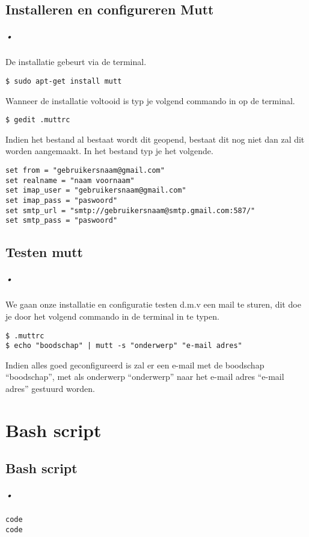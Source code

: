 \documentclass[12pt,a4paper]{report}
\begin{document}
\section{Installeren en configureren Mutt}
\paragraph{•}
De installatie gebeurt via de terminal.
\begin{lstlisting}[frame=BTrl]
$ sudo apt-get install mutt
\end{lstlisting}
Wanneer de installatie voltooid is typ je volgend commando in op de terminal.
\begin{lstlisting}[frame=BTrl]
$ gedit .muttrc
\end{lstlisting}
Indien het bestand al bestaat wordt dit geopend, bestaat dit nog niet dan zal dit worden aangemaakt. In het bestand typ je het volgende.
\begin{lstlisting}[frame=BTrl]
set from = "gebruikersnaam@gmail.com"
set realname = "naam voornaam"
set imap_user = "gebruikersnaam@gmail.com"
set imap_pass = "paswoord"
set smtp_url = "smtp://gebruikersnaam@smtp.gmail.com:587/"
set smtp_pass = "paswoord"
\end{lstlisting}

\section{Testen mutt}
\paragraph{•}
We gaan onze installatie en configuratie testen d.m.v een mail te sturen, dit doe je door het volgend commando in de terminal in te typen.
\begin{lstlisting}[frame=BTrl]
$ .muttrc
$ echo "boodschap" | mutt -s "onderwerp" "e-mail adres"
\end{lstlisting}
Indien alles goed geconfigureerd is zal er een e-mail met de boodschap ``boodschap'', met als onderwerp ``onderwerp'' naar het e-mail adres ``e-mail adres'' gestuurd worden.

\renewcommand\thechapter{C} %
\chapter{Bash script}
\section{Bash script}
\paragraph{•}
\begin{lstlisting}[frame=BTrl]
code
code
\end{lstlisting}

\listoffigures

\listoftables

\printindex



\nocite{LaTeX,LaTeX2,Appendix}
\end{document}
